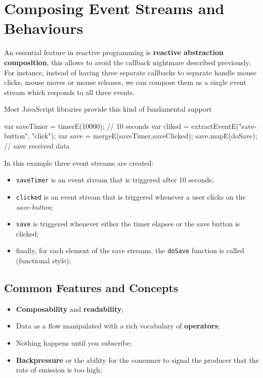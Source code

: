 \section{Composing Event Streams and Behaviours}\label{sec:rp_composing_event_streams_and_behaviours} %
An essential feature in reactive programming is \textbf{reactive abstraction composition}, this allows to avoid the callback nightmare described previously.
For instance, instead of having three separate callbacks to separate handle mouse clicks, mouse moves or mouse releases, we can compose them as a single event stream which responds to all three events.
\begin{note}
    Most JavaScript libraries provide this kind of fundamental support
\end{note}
\begin{example}{}{}
    \begin{codeblock}[js]{}
    var saveTimer = timerE(10000); // 10 seconds
    var cliked = extractEventE("save-button", "click");
    var save = mergeE(saveTimer,saveClicked);
    save.mapE(doSave); // save received data
    \end{codeblock}
    In this example three event streams are created:
    \begin{itemize}
        \item \texttt{saveTimer} is an event stream that is triggered after $10$ seconds;
        \item \texttt{clicked} is an event stream that is triggered whenever a user clicks on the \textit{save-button};
        \item \texttt{save} is triggered whenever either the timer elapses or the save button is clicked;
        \item finally, for each element of the save streams, the \texttt{doSave} function is called (functional style);
    \end{itemize}
\end{example}
%
\subsection{Common Features and Concepts}\label{sub:rp_common_features_and_concepts} %
\begin{itemize}
    \item \textbf{Composability} and \textbf{readability};
    \item Data as a flow manipulated with a rich vocabulary of \textbf{operators};
    \item Nothing happens until you subscribe;
    \item \textbf{Backpressure} or the ability for the consumer to signal the producer that the rate of emission is too high;
\end{itemize}
%

